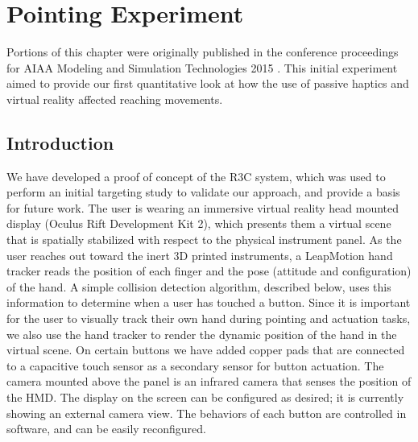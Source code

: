 \chapter{Pointing Experiment}
\label{chap:pointing}

Portions of this chapter were originally published in the conference proceedings for AIAA Modeling and Simulation Technologies 2015 \citep{joyce_rapidly_2015}.
This initial experiment aimed to provide our first quantitative look at how the use of passive haptics and virtual reality affected reaching movements.

\section{Introduction}

We have developed a proof of concept of the R3C system, which was used to perform an initial targeting study to validate our approach, and provide a basis for future work.
The user is wearing an immersive virtual reality head mounted display (Oculus Rift Development Kit 2), which presents them a virtual scene that is spatially stabilized with respect to the physical instrument panel.
As the user reaches out toward the inert 3D printed instruments, a LeapMotion hand tracker reads the position of each finger and the pose (attitude and configuration) of the hand.
A simple collision detection algorithm, described below, uses this information to determine when a user has touched a button.
Since it is important for the user to visually track their own hand during pointing and actuation tasks, we also use the hand tracker to render the dynamic position of the hand in the virtual scene.
On certain buttons we have added copper pads that are connected to a capacitive touch sensor as a secondary sensor for button actuation.
The camera mounted above the panel is an infrared camera that senses the position of the HMD.
The display on the screen can be configured as desired; it is currently showing an external camera view.
The behaviors of each button are controlled in software, and can be easily reconfigured.

